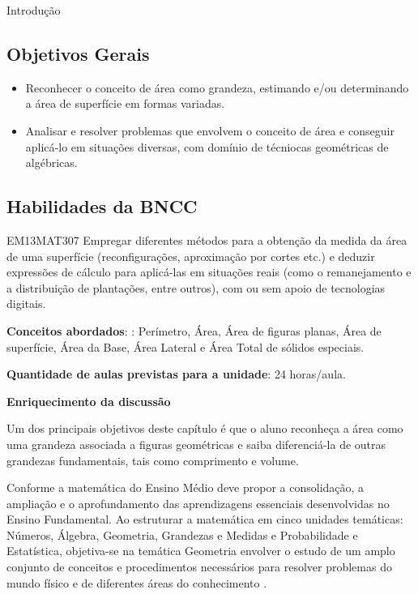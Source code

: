 \mainmatter

\begin{apresentacao}{Introdução}
\subsection{Objetivos Gerais}
\begin{itemize}
\item Reconhecer o conceito de área como grandeza, estimando e/ou determinando a área de superfície em formas variadas.
\item Analisar e resolver problemas que envolvem o conceito de área e conseguir aplicá-lo em situações diversas, com domínio de técniocas geométricas de algébricas.
\end{itemize}

\subsection{Habilidades da BNCC}
\begin{habilities}{EM13MAT307}
Empregar diferentes métodos para a obtenção da medida da área de uma superfície (reconfigurações, aproximação por cortes etc.) e deduzir expressões de cálculo para aplicá-las em situações reais (como o remanejamento e a distribuição de plantações, entre outros), com ou sem apoio de tecnologias digitais.
\end{habilities}

\textbf{Conceitos abordados}: : Perímetro, Área, Área de figuras planas, Área de superfície, Área da Base, Área Lateral e Área Total de sólidos especiais.

\textbf{Quantidade de aulas previstas para a unidade}: 24 horas/aula.

\textbf{Enriquecimento da discussão}

Um dos principais objetivos deste capítulo é que o aluno reconheça a área como uma grandeza associada a figuras geométricas e saiba diferenciá-la de outras grandezas fundamentais, tais como comprimento e volume. 

Conforme \citet{BNCC2019} a matemática do Ensino Médio deve propor a consolidação, a ampliação e o aprofundamento das aprendizagens essenciais desenvolvidas no Ensino Fundamental. Ao estruturar a matemática em cinco unidades temáticas: Números, Álgebra, Geometria, Grandezas e Medidas e Probabilidade e Estatística, objetiva-se na temática Geometria envolver o estudo de um amplo conjunto de conceitos e procedimentos necessários para resolver problemas do mundo físico e de diferentes áreas do conhecimento \cite{BNCC2019}.


\end{apresentacao}

